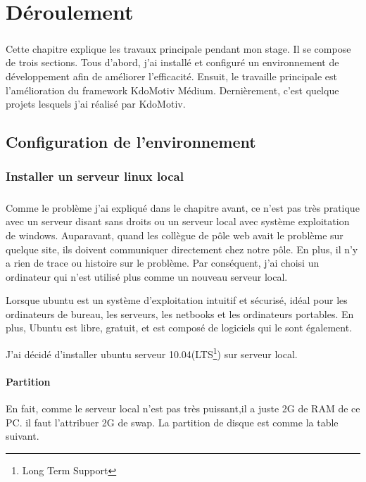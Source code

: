 \chapter{Déroulement}\thispagestyle{fancy}

\paragraph{}
Cette chapitre explique les travaux principale pendant mon stage. Il se compose de trois sections. Tous d'abord, j'ai installé et configuré un environnement de développement afin de améliorer l'efficacité. Ensuit, le travaille principale est l'amélioration du framework KdoMotiv Médium. Dernièrement, c'est quelque projets lesquels j'ai réalisé par KdoMotiv.

\section{Configuration de l'environnement}

\subsection{Installer un serveur linux local}
\paragraph{}
Comme le problème j'ai expliqué dans le chapitre avant, ce n'est pas très pratique avec un serveur disant sans droits ou un serveur local avec système exploitation de windows.
Auparavant, quand les collègue de pôle web avait le problème sur quelque site, ils doivent communiquer directement chez notre pôle. En plus, il n'y a rien de trace ou histoire sur le problème. 
Par conséquent, j'ai choisi un ordinateur qui n'est utilisé plus comme un nouveau serveur local. 

Lorsque ubuntu est un système d'exploitation intuitif et sécurisé, idéal pour les ordinateurs de bureau, les serveurs, les netbooks et les ordinateurs portables. En plus, Ubuntu est libre, gratuit, et est composé de logiciels qui le sont également.

J'ai décidé d'installer ubuntu serveur 10.04(LTS\footnote{Long Term Support}) sur serveur local.

\subsubsection{Partition}
En fait, comme le serveur local n'est pas très puissant,il a juste 2G de RAM de ce PC.  il faut l'attribuer 2G de swap. La partition de disque est comme la table suivant.


